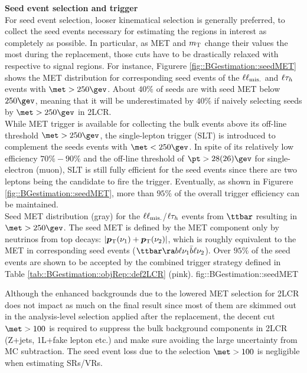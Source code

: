 \noindent \textbf{Seed event selection and trigger} \\
For seed event selection, looser kinematical selection is generally preferred, to collect the seed events necessary for estimating the regions in interest as completely as possible. In particular, as MET and $m_{\mathrm{T}}$ change their values the most during the replacement, those cuts have to be drastically relaxed with respective to signal regions. For instance, Figurere \ref{fig::BGestimation::seedMET} shows the MET distribution for corresponding seed events of the $\ell\ell_{\mathrm{mis.}}$ and $\ell\tau_h$ events with $\met>250\gev$. About $40\%$ of seeds are with seed MET below $250\gev$, meaning that it will be underestimated by $40\%$ if naively selecting seeds by $\met>250\gev$ in 2LCR. \\ 

While MET trigger is available for collecting the bulk events above its off-line threshold $\met>250\gev$, the single-lepton trigger (SLT) is introduced to complement the seeds events with $\met<250\gev$.
In spite of its relatively low efficiency $70\%-90\%$ and the off-line threshold of $\pt > 28 (26) \gev$ for single-electron (muon), SLT is still fully efficient for the seed events since there are two leptons being the candidate to fire the trigger. Eventually, as shown in Figurere \ref{fig::BGestimation::seedMET}, more than $95\%$ of the overall trigger efficiency can be maintained. \\

{Seed MET distribution (gray) for the $\ell\ell_{\mathrm{mis.}}$/$\ell\tau_h$ events from $\ttbar$ resulting in $\met>250\gev$. The seed MET is defined by the MET component only by neutrinos from top decays: $\left|\bm{p}_{\mathrm{T}}(\nu_1)+\bm{p}_{\mathrm{T}}(\nu_2)\right|$, which is roughly equivalent to the MET in corresponding seed events ($\ttbar \ra b\ell\nu_1 \bar{b}\ell\nu_2$). Over $95\%$ of the seed events are shown to be accepted by the combined trigger strategy defined in Table \ref{tab::BGestimation::objRep::def2LCR} (pink). }
{fig::BGestimation::seedMET}

Although the enhanced backgrounds due to the lowered MET selection for 2LCR does not impact as much on the final result since most of them are skimmed out in the analysis-level selection applied after the replacement, the decent cut $\met>100$ is required to suppress the bulk background components in 2LCR (Z+jets, 1L+fake lepton etc.) and make sure avoiding the large uncertainty from MC subtraction. The seed event loss due to the selection $\met>100$ is negligible when estimating SRs/VRs.  \\

